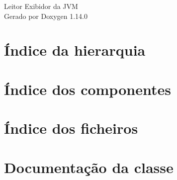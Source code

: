 \documentclass[twoside]{book}
\newcommand{\+}{\discretionary{\mbox{\scriptsize$\hookleftarrow$}}{}{}}
\newcommand{\clearemptydoublepage}{%
    \newpage{\pagestyle{empty}\cleardoublepage}%
  }
\begin{document}
  \raggedbottom
    \hypersetup{pageanchor=false,
                bookmarksnumbered=true,
                pdfencoding=unicode
               }
  \begin{titlepage}
  \vspace*{7cm}
  \begin{center}%
  {\Large Leitor Exibidor da JVM}\\
  \vspace*{1cm}
  {\large Gerado por Doxygen 1.14.0}\\
  \end{center}
  \end{titlepage}
  \clearemptydoublepage
  \tableofcontents
  \clearemptydoublepage
  \hypersetup{pageanchor=true}

\chapter{Índice da hierarquia}

\chapter{Índice dos componentes}

\chapter{Índice dos ficheiros}

\chapter{Documentação da classe}

















































\end{document}
